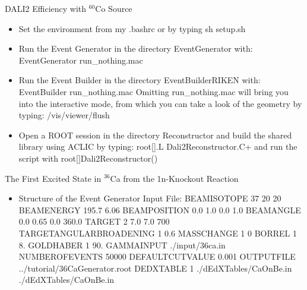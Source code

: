 \documentclass[
  style=pd,
  clock
]{powerdot}
\begin{document}
\begin{CJK}{UTF8}{min}
\begin{slide}[toc=,bm=]{DALI2 Efficiency with $^{60}$Co Source}
  \begin{itemize}
\item Set the environment from my {\ttfamily .bashrc} or by typing {\ttfamily sh setup.sh}
  \item Run the Event Generator in the directory {\ttfamily EventGenerator} with:\linebreak
    {\ttfamily  EventGenerator run\_nothing.mac} 
  \item Run the Event Builder in the directory {\ttfamily EventBuilderRIKEN} with:\linebreak
    {\ttfamily  EventBuilder run\_nothing.mac} \linebreak
    Omitting {\ttfamily run\_nothing.mac} will bring you into the interactive mode, from which you 
    can take a look of the geometry by typing:\linebreak
    {\ttfamily /vis/viewer/flush}
  \item Open a ROOT session in the directory {\ttfamily Reconstructor} and 
    build the shared library using ACLIC by typing:\linebreak
    {\ttfamily root[].L Dali2Reconstructor.C+}\linebreak
    and run the script with \linebreak
    {\ttfamily root[]Dali2Reconstructor()}
  \end{itemize}
\end{slide}

\begin{slide}{The First Excited State in $^{36}$Ca from the 1n-Knockout Reaction}
\begin{itemize}
\item Structure of the Event Generator Input File:\linebreak 
  {\ttfamily \small
    BEAMISOTOPE 37 20 20\linebreak
    BEAMENERGY 195.7 6.06\linebreak
    BEAMPOSITION 0.0 1.0 0.0 1.0\linebreak
    BEAMANGLE 0.0 0.65 0.0 360.0\linebreak
    TARGET 2 7.0 7.0 700\linebreak
    TARGETANGULARBROADENING 1 0.6\linebreak
    MASSCHANGE 1 0\linebreak
    BORREL 1 8.\linebreak
    GOLDHABER 1 90.\linebreak
    GAMMAINPUT ./input/36ca.in\linebreak
    NUMBEROFEVENTS 50000\linebreak
    DEFAULTCUTVALUE 0.001\linebreak
    OUTPUTFILE ../tutorial/36CaGenerator.root\linebreak
    DEDXTABLE 1 ./dEdXTables/CaOnBe.in ./dEdXTables/CaOnBe.in\linebreak
  }
\end{itemize}



\end{slide}
\end{CJK}
\end{document}
